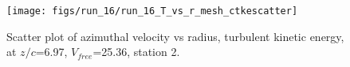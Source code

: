 \begin{figure}[H]
\centering
\texttt{[image: figs/run\_16/run\_16\_T\_vs\_r\_mesh\_ctkescatter]}
\caption{Scatter plot of azimuthal velocity vs radius, turbulent kinetic energy, at $z/c$=6.97, $V_{free}$=25.36, station 2.}
\label{fig:run_16_T_vs_r_mesh_ctkescatter}
\end{figure}


